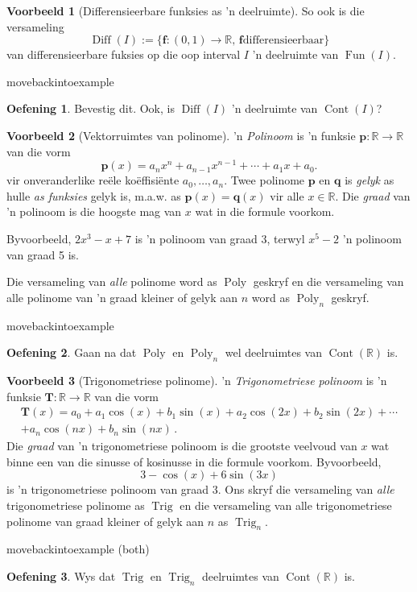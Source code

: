 \documentclass[a4paper,11pt]{book}
\theoremstyle{definition}
\newtheorem{exercise}{Oefening}
\newtheorem{example_environment}{Voorbeeld}[chapter]
\newcommand{\be}{\begin{equation}}
\newcommand{\ee}{\end{equation}}
\newcommand{\ve}[1]{\mathbf{#1}}
\newenvironment{example}
	{
		\begin{oframed}
		\begin{example_environment}
	}
	{
		\end{example_environment}
		\end{oframed}
	}
\DeclareMathOperator{\Fun}{Fun}
\DeclareMathOperator{\Cont}{Cont}
\DeclareMathOperator{\Diff}{Diff}
\DeclareMathOperator{\Poly}{Poly}
\DeclareMathOperator{\Trig}{Trig}
\begin{document}
\begin{example}[Differensieerbare funksies as 'n deelruimte] So ook is die
	versameling
	\[
		\Diff(I) := \{ \ve{f}: (0,1) \rightarrow \mathbb{R}, \, \ve{f}
		\mbox{differensieerbaar} \}
	\]
	van differensieerbare fuksies op die oop interval $I$ 'n deelruimte van
	$\Fun (I)$.

\end{example}movebackintoexample
	\begin{exercise}
	Bevestig dit. Ook, is $\Diff( I)$ 'n deelruimte van $\Cont(I)$?
\end{exercise}
\begin{example}[Vektorruimtes van polinome] 
	'n \emph{Polinoom} is 'n funksie $\ve{p} : \mathbb{R}
	\rightarrow \mathbb{R}$ van die vorm
	\be
	\ve{p}(x) = a_n x^n + a_{n-1}x^{n-1} + \cdots + a_1 x + a_0.
	\label{formula_poly}
	\ee
	vir onveranderlike re{\"e}le ko{\"e}ffisi{\"e}nte $a_0, \ldots, a_n$.
	Twee polinome $\ve{p}$ en $\ve{q}$ is \emph{gelyk} as hulle \emph{as
	funksies} gelyk is, m.a.w. as $\ve{p}(x) = \ve{q} (x)$ vir alle $x \in
	\mathbb{R}$. Die \emph{graad} van 'n polinoom is die hoogste mag van
	$x$ wat in die formule voorkom.

	Byvoorbeeld, $2x^3 - x + 7$ is 'n polinoom van graad 3, terwyl $x^5 -
	2$ 'n polinoom van graad 5 is.
	
	Die versameling van \emph{alle} polinome word as $\Poly$
	geskryf en die versameling van alle polinome van 'n graad kleiner of
	gelyk aan $n$ word as $\Poly_n$ geskryf.


\end{example}movebackintoexample
	\begin{exercise}
	Gaan na dat $\Poly$ en $\Poly_n$ wel deelruimtes van $\Cont
	(\mathbb{R})$ is.
\end{exercise}
\begin{example}[Trigonometriese polinome] \label{trig_poly_example} 'n
	\emph{Trigonometriese polinoom} is 'n funksie $\ve{T} : \mathbb{R}
	\rightarrow \mathbb{R}$ van die vorm
	\begin{multline} \label{formula_for_trig_poly}
		\ve{T} (x) = a_0 + a_1 \cos(x) + b_1 \sin(x) + a_2 \cos(2x) + b_2
		\sin(2x) + \cdots \\ + a_n \cos(nx) + b_n \sin(nx) \, .
	\end{multline}
	Die \emph{graad} van 'n trigonometriese polinoom is die grootste
	veelvoud van $x$ wat binne een van die sinusse of kosinusse in die
	formule voorkom.  Byvoorbeeld,
	\[
		3 - \cos(x) + 6 \sin(3x)
	\]
	is 'n trigonometriese polinoom van graad 3. Ons skryf die versameling
	van \emph{alle} trigonometriese polinome as $\Trig$ en die versameling
	van alle trigonometriese polinome van graad kleiner of gelyk aan $n$ as
	$\Trig_n$.


\end{example}movebackintoexample (both)
	\begin{exercise}
	Wys dat $\Trig$ en $\Trig_n$ deelruimtes van $\Cont (\mathbb{R})$
	is.
\end{exercise}
\end{document}
